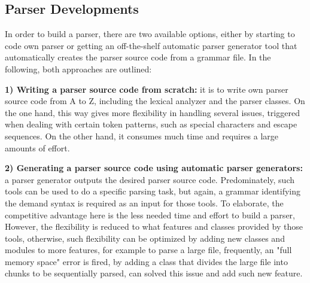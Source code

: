 \subsection{Parser Developments}
In order to build a parser, there are two available options, either by starting  to code own parser  or getting an off-the-shelf automatic parser generator tool that automatically creates the parser source code from a grammar file. In the following, both approaches are outlined:

\textbf{1) Writing a parser source code from scratch:} it is to write own parser source code from A to Z, including the lexical analyzer and the parser classes. On the one hand, this way gives more flexibility in handling several issues, triggered when dealing with certain token patterns, such as special characters and escape sequences. On the other hand, it consumes much time and requires a large amounts of  effort.

\textbf{2) Generating a parser source code using automatic parser generators:} a parser generator outputs the desired parser source code. Predominately, such tools can be used to do a specific parsing task, but again, a grammar identifying the  demand syntax is required as an input for those tools. To elaborate, the competitive advantage here is the less needed time and effort to build a parser, However, the flexibility is reduced to what features and classes provided by those tools, otherwise, such flexibility can be  optimized by adding new classes and modules to more features, for example to parse a large file, frequently, an "full memory space" error is fired, by adding a class that divides the large file into chunks to be sequentially parsed, can solved this issue and add such new feature.  

